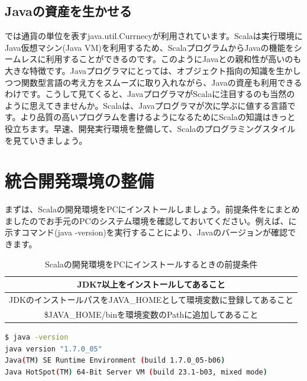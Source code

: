\subsection*{Javaの資産を生かせる}
では通貨の単位を表すjava.util.Currnecyが利用されています。Scalaは実行環境にJava仮想マシン(Java VM)を利用するため、ScalaプログラムからJavaの機能をシームレスに利用することができるのです。このようにJavaとの親和性が高いのも大きな特徴です。Javaプログラマにとっては、オブジェクト指向の知識を生かしつつ関数型言語の考え方をスムーズに取り入れながら、Javaの資産も利用できるわけです。こうして見てくると、JavaプログラマがScalaに注目するのも当然のように思えてきませんか。Scalaは、Javaプログラマが次に学ぶに値する言語です。より品質の高いプログラムを書けるようになるためにScalaの知識はきっと役立ちます。早速、開発実行環境を整備して、Scalaのプログラミングスタイルを見ていきましょう。

\section{統合開発環境の整備}
まずは、Scalaの開発環境をPCにインストールしましょう。前提条件をにまとめましたのでお手元のPCのシステム環境を確認しておいてください。例えば、に示すコマンド(java -version)を実行することにより、Javaのバージョンが確認できます。

\begin{table}[htb]
  \caption{Scalaの開発環境をPCにインストールするときの前提条件}
  \begin{center}
    \begin{tabular}{|c|} \hline
      JDK7以上をインストールしてあること\\ \hline
      JDKのインストールパスをJAVA\_HOMEとして環境変数に登録してあること\\ \hline
      \$JAVA\_HOME/binを環境変数のPathに追加してあること\\ \hline
    \end{tabular}
  \end{center}
  \label{tb:scala_pre_conditions}
\end{table}

\begin{lstlisting}[language=bash, frame=none, label=cmd:java_version, caption=Javaのバージョンを確認する方法]
$ java -version
java version "1.7.0_05"
Java(TM) SE Runtime Environment (build 1.7.0_05-b06)
Java HotSpot(TM) 64-Bit Server VM (build 23.1-b03, mixed mode)
\end{lstlisting}

